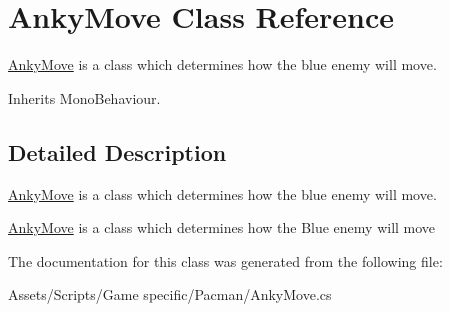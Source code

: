 \hypertarget{class_anky_move}{\section{Anky\-Move Class Reference}
\label{class_anky_move}
}


\hyperlink{class_anky_move}{Anky\-Move} is a class which determines how the blue enemy will move.  




Inherits Mono\-Behaviour.



\subsection{Detailed Description}
\hyperlink{class_anky_move}{Anky\-Move} is a class which determines how the blue enemy will move. 

\hyperlink{class_anky_move}{Anky\-Move} is a class which determines how the Blue enemy will move 

The documentation for this class was generated from the following file\-:\begin{DoxyCompactItemize}
\item 
Assets/\-Scripts/\-Game specific/\-Pacman/Anky\-Move.\-cs\end{DoxyCompactItemize}
